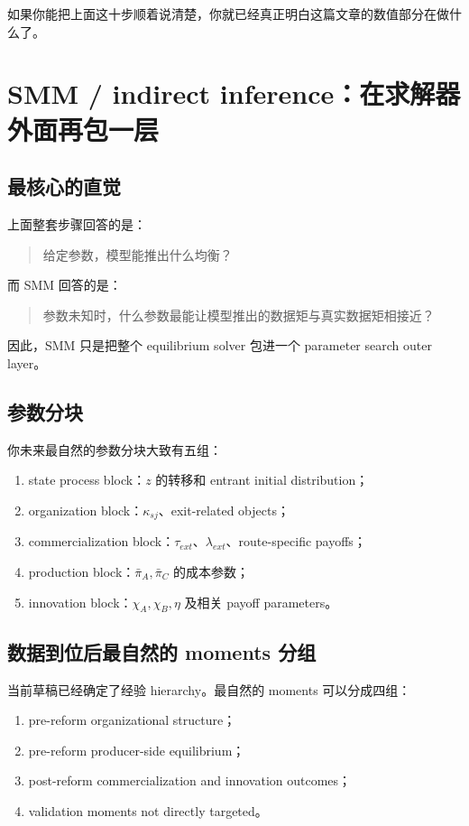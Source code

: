 \documentclass[12pt]{ctexart}
\begin{document}
如果你能把上面这十步顺着说清楚，你就已经真正明白这篇文章的数值部分在做什么了。

\section{SMM / indirect inference：在求解器外面再包一层}

\subsection{最核心的直觉}

上面整套步骤回答的是：
\begin{quote}
给定参数，模型能推出什么均衡？
\end{quote}

而 SMM 回答的是：
\begin{quote}
参数未知时，什么参数最能让模型推出的数据矩与真实数据矩相接近？
\end{quote}

因此，SMM 只是把整个 equilibrium solver 包进一个 parameter search outer layer。

\subsection{参数分块}

你未来最自然的参数分块大致有五组：
\begin{enumerate}
    \item state process block：$z$ 的转移和 entrant initial distribution；
    \item organization block：$\kappa_{sj}$、exit-related objects；
    \item commercialization block：$\tau_{ext}$、$\lambda_{ext}$、route-specific payoffs；
    \item production block：$\bar\pi_A,\bar\pi_C$ 的成本参数；
    \item innovation block：$\chi_A,\chi_B,\eta$ 及相关 payoff parameters。
\end{enumerate}

\subsection{数据到位后最自然的 moments 分组}

当前草稿已经确定了经验 hierarchy。最自然的 moments 可以分成四组：
\begin{enumerate}
    \item pre-reform organizational structure；
    \item pre-reform producer-side equilibrium；
    \item post-reform commercialization and innovation outcomes；
    \item validation moments not directly targeted。
\end{enumerate}
\end{document}
